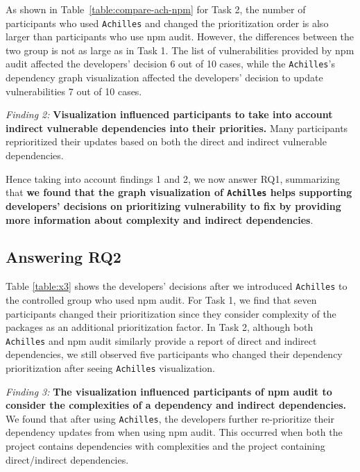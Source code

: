 \documentclass[conference]{IEEEtran}
\begin{document}
	As shown in Table~\ref{table:compare-ach-npm} for Task 2, the number of participants who used \texttt{Achilles} and changed the prioritization order is also larger than participants who use npm audit. 
	However, the differences between the two group is not as large as in Task 1. The list of vulnerabilities provided by npm audit affected the developers' decision 6 out of 10 cases, while the \texttt{Achilles}'s dependency graph visualization affected the developers' decision to update vulnerabilities 7 out of 10 cases.
\begin{tcolorbox}
    \textit{Finding 2:} \textbf{Visualization influenced participants to take into account indirect vulnerable dependencies into their priorities.} Many participants reprioritized their updates based on both the direct and indirect vulnerable dependencies. 
\end{tcolorbox}

Hence taking into account findings 1 and 2, we now answer RQ1, summarizing that \textbf{we found that the graph visualization of \texttt{Achilles} helps supporting developers' decisions on prioritizing vulnerability to fix by providing more information about complexity and indirect dependencies}.

\subsection{Answering RQ2}
	
	Table \ref{table:x3} shows the developers' decisions after we introduced \texttt{Achilles} to the controlled group who used npm audit. For Task 1, we find that seven participants changed their prioritization since they consider complexity of the packages as an additional prioritization factor. In Task 2, although both \texttt{Achilles} and npm audit similarly provide a report of direct and indirect dependencies, we still observed five participants who changed their dependency prioritization after seeing \texttt{Achilles} visualization.
	
	\begin{tcolorbox}
    \textit{Finding 3:} \textbf{The visualization influenced participants of npm audit to consider the complexities of a dependency and indirect dependencies.} We found that after using \texttt{Achilles}, the developers further re-prioritize their dependency updates from when using npm audit. This occurred when both the project contains dependencies with complexities and the project containing direct/indirect dependencies.
    \end{tcolorbox}
\end{document}
